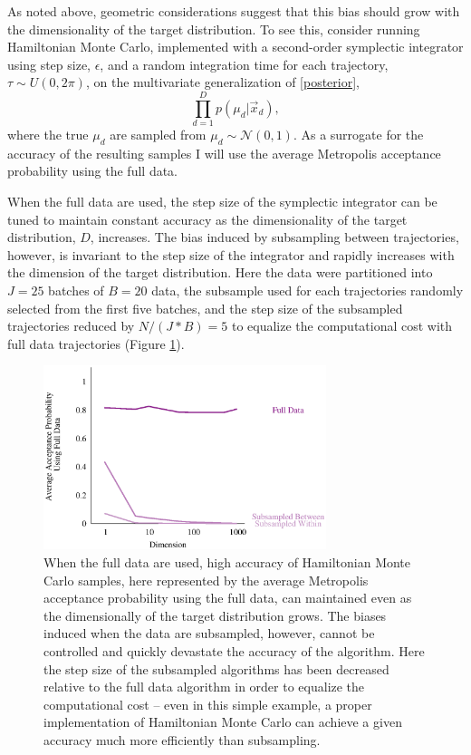 \documentclass{article}
\begin{document}
As noted above, geometric considerations suggest that this bias should grow with the 
dimensionality of the target distribution.  To see this, consider running Hamiltonian
Monte Carlo, implemented with a second-order symplectic integrator using step size, 
$\epsilon$, and a random integration time for each trajectory, $\tau \sim U \! \left(0, 2 \pi \right)$,
on the multivariate generalization of \eqref{posterior},
%
\begin{equation} \label{multivariate_posterior}
\prod_{d = 1}^{D} p \! \left( \mu_{d} | \vec{x}_{d} \right),
\end{equation}
%
where the true $\mu_{d}$ are sampled from $\mu_{d} \sim \mathcal{N} \! \left( 0, 1 \right)$.
As a surrogate for the accuracy of the resulting samples I will use the average
Metropolis acceptance probability using the full data.

When the full data are used, the step size of the symplectic integrator can be tuned to 
maintain constant accuracy as the dimensionality of the target distribution, $D$, increases.
The bias induced by subsampling between trajectories, however, is invariant to the
step size of the integrator and rapidly increases with the dimension of the target distribution.
Here the data were partitioned into $J = 25$ batches of $B = 20$ data, the subsample
used for each trajectories randomly selected from the first five batches, and the step size 
of the subsampled trajectories reduced by $N / (J * B) = 5$ to equalize the computational
cost with full data trajectories (Figure \ref{fig:multivariate}).

\begin{figure}
\centering
\includegraphics[width=3.25in]{multivariate.eps}
\caption{When the full data are used, high accuracy of Hamiltonian Monte Carlo samples, 
here represented by the average Metropolis acceptance probability using the full data, can 
maintained even as the dimensionally of the target distribution grows.  The biases induced 
when the data are subsampled, however, cannot be controlled and quickly devastate the 
accuracy of the algorithm.  Here the step size of the subsampled algorithms has been decreased
relative to the full data algorithm in order to equalize the computational cost -- even in this
simple example, a proper implementation of Hamiltonian Monte Carlo can achieve a given
accuracy much more efficiently than subsampling.}
\label{fig:multivariate}
\end{figure}
\end{document}
